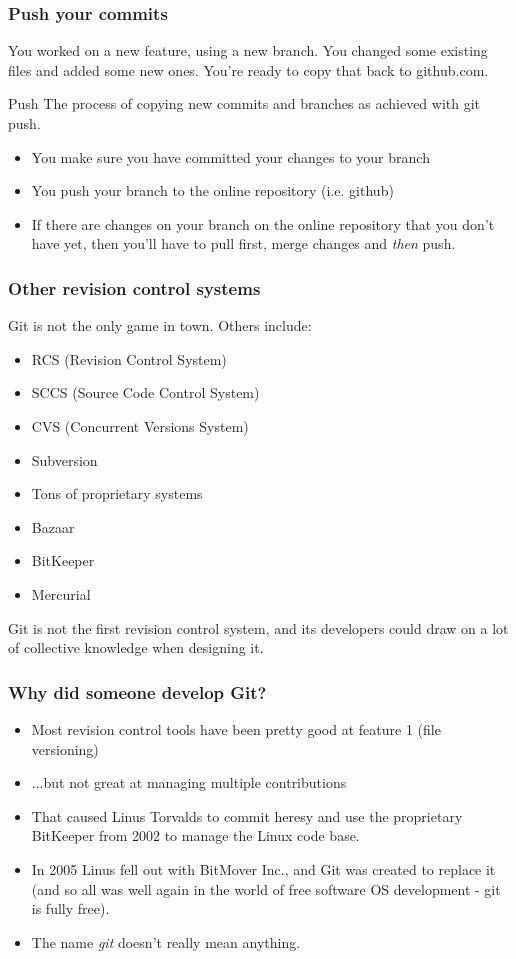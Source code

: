 \documentclass{beamer}
\begin{document}
\begin{frame}
  \frametitle{Push your commits}
  You worked on a new feature, using a new branch. You changed some existing
  files and added some new ones. You're ready to copy that back to github.com.
  \begin{block}{Push}
    The process of copying new commits and branches as achieved with git \alert{push}.
    \begin{itemize}
    \item You make sure you have \alert{committed} your changes to your branch
    \item You \alert{push} your branch to the online repository (i.e. github)
    \item If there are changes on your branch on the online repository that you don't
      have yet, then you'll have to pull first, \alert{merge} changes and
      \emph{then} push.
    \end{itemize}
  \end{block}
\end{frame}

\begin{frame}
  \frametitle{Other revision control systems}
  Git is not the only game in town. Others include:

  \begin{itemize}
  \item RCS (Revision Control System)
  \item SCCS (Source Code Control System)
  \item CVS (Concurrent Versions System)
  \item Subversion
  \item Tons of proprietary systems
  \item Bazaar
  \item BitKeeper
  \item Mercurial
  \end{itemize}

  \pause Git is not the first revision control system, and its
  developers could draw on a lot of collective knowledge when
  designing it.
\end{frame}

\begin{frame}
  \frametitle{Why did someone develop Git?}
  \begin{itemize}
    \pause \item Most revision control tools have been pretty good at
    feature 1 (file versioning)
    \pause \item ...but not great at managing multiple contributions
    \pause \item That caused Linus Torvalds to commit heresy and use the
    \alert{proprietary} BitKeeper from 2002 to manage the Linux code base.
    \pause \item In 2005 Linus fell out with BitMover Inc., and Git was
    created to replace it (and so all was well again in the world of free
    software OS development - git is fully free).
    \pause \item The name \emph{git} doesn't really mean anything.
  \end{itemize}
\end{frame}
\end{document}
